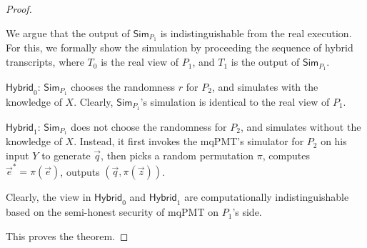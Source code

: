 \documentclass[a4paper,10pt]{article}
\begin{document}
\begin{proof}
\begin{trivlist}
We argue that the output of $\mathsf{Sim}_{P_1}$ is indistinguishable from the real execution. 
For this, we formally show the simulation by proceeding the sequence of hybrid transcripts, 
where $T_0$ is the real view of $P_1$, and $T_1$ is the output of $\mathsf{Sim}_{P_1}$. 

\item $\mathsf{Hybrid}_0$: $\mathsf{Sim}_{P_1}$ chooses the randomness $r$ for $P_2$, 
    and simulates with the knowledge of $X$. Clearly, $\mathsf{Sim}_{P_1}$'s simulation is identical to the real view of $P_1$.    

\item $\mathsf{Hybrid}_1$: $\mathsf{Sim}_{P_1}$ does not choose the randomness for $P_2$, 
    and simulates without the knowledge of $X$. Instead, it first invokes the mqPMT's simulator for $P_2$ 
    on his input $Y$ to generate $\vec{q}$, then picks a random permutation $\pi$, computes $\vec{e}^* = \pi(\vec{e})$,  
    outputs $(\vec{q}, \pi(\vec{z}))$.  

\item Clearly, the view in $\mathsf{Hybrid}_0$ and $\mathsf{Hybrid}_1$ are computationally indistinguishable 
    based on the semi-honest security of mqPMT on $P_1$'s side. 
\end{trivlist} 
This proves the theorem. 
\end{proof}
\end{document}
